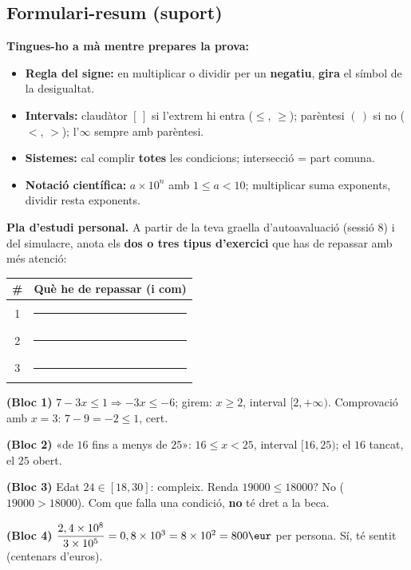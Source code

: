 \subsection{Formulari-resum (suport)}

\begin{idea}
\textbf{Tingues-ho a mà mentre prepares la prova:}
\begin{itemize}[leftmargin=1.4em, itemsep=2pt]
  \item \textbf{Regla del signe:} en multiplicar o dividir per un \textbf{negatiu},
        \textbf{gira} el símbol de la desigualtat.
  \item \textbf{Intervals:} claudàtor $[\,]$ si l'extrem hi entra ($\le$, $\ge$);
        parèntesi $(\,)$ si no ($<$, $>$); l'$\infty$ sempre amb parèntesi.
  \item \textbf{Sistemes:} cal complir \textbf{totes} les condicions; intersecció =
        part comuna.
  \item \textbf{Notació científica:} $a\times 10^{n}$ amb $1\le a<10$; multiplicar
        suma exponents, dividir resta exponents.
\end{itemize}
\end{idea}

\noindent\textbf{Pla d'estudi personal.} A partir de la teva graella d'autoavaluació
(sessió 8) i del simulacre, anota els \textbf{dos o tres tipus d'exercici} que has de
repassar amb més atenció:
\begin{center}
\renewcommand{\arraystretch}{1.5}
\begin{tabular}{c p{10.5cm}}
\toprule
\textbf{\#} & \textbf{Què he de repassar (i com)} \\
\midrule
1 & \rule{9.8cm}{0.4pt} \\
2 & \rule{9.8cm}{0.4pt} \\
3 & \rule{9.8cm}{0.4pt} \\
\bottomrule
\end{tabular}
\end{center}

\begin{solucions}
\begin{sollist}
  \item \textbf{(Bloc 1)} $7-3x\le 1 \Rightarrow -3x\le -6$; girem: $x\ge 2$, interval
        $[2,+\infty)$. Comprovació amb $x=3$: $7-9=-2\le 1$, cert.
  \item \textbf{(Bloc 2)} «de $16$ fins a menys de $25$»: $16\le x<25$, interval
        $[16,25)$; el $16$ tancat, el $25$ obert.
  \item \textbf{(Bloc 3)} Edat $24\in[18,30]$: compleix. Renda
        $\num{19000}\le\num{18000}$? No ($\num{19000}>\num{18000}$). Com que falla una
        condició, \textbf{no} té dret a la beca.
  \item \textbf{(Bloc 4)} $\dfrac{2,4\times 10^{8}}{3\times 10^{5}}=0,8\times 10^{3}
        =8\times 10^{2}=800\eur$ per persona. Sí, té sentit (centenars d'euros).
\end{sollist}
\end{solucions}
